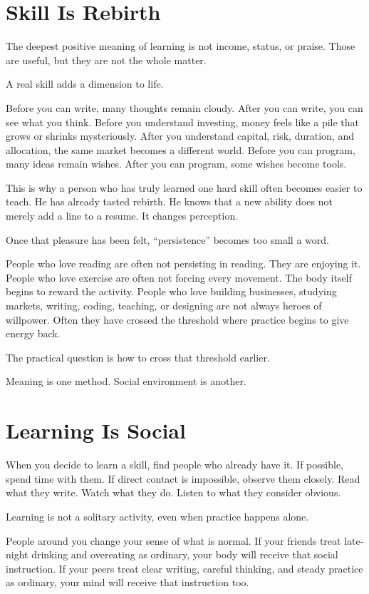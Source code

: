 \section*{Skill Is Rebirth}

The deepest positive meaning of learning is not income, status, or praise. Those are useful, but they are not the whole matter.

A real skill adds a dimension to life.

Before you can write, many thoughts remain cloudy. After you can write, you can see what you think. Before you understand investing, money feels like a pile that grows or shrinks mysteriously. After you understand capital, risk, duration, and allocation, the same market becomes a different world. Before you can program, many ideas remain wishes. After you can program, some wishes become tools.

This is why a person who has truly learned one hard skill often becomes easier to teach. He has already tasted rebirth. He knows that a new ability does not merely add a line to a resume. It changes perception.

Once that pleasure has been felt, ``persistence'' becomes too small a word.

People who love reading are often not persisting in reading. They are enjoying it. People who love exercise are often not forcing every movement. The body itself begins to reward the activity. People who love building businesses, studying markets, writing, coding, teaching, or designing are not always heroes of willpower. Often they have crossed the threshold where practice begins to give energy back.

The practical question is how to cross that threshold earlier.

Meaning is one method. Social environment is another.

\section*{Learning Is Social}

When you decide to learn a skill, find people who already have it. If possible, spend time with them. If direct contact is impossible, observe them closely. Read what they write. Watch what they do. Listen to what they consider obvious.

Learning is not a solitary activity, even when practice happens alone.

People around you change your sense of what is normal. If your friends treat late-night drinking and overeating as ordinary, your body will receive that social instruction. If your peers treat clear writing, careful thinking, and steady practice as ordinary, your mind will receive that instruction too.

